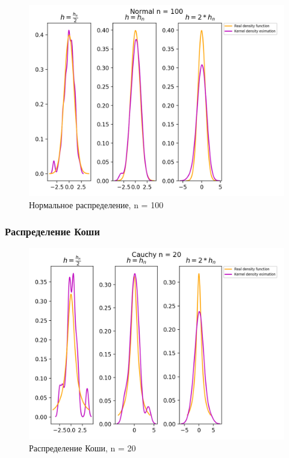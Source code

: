 \begin{figure}[H]
	\begin{center}
		\includegraphics[scale=0.7]{fig/Normal100_kde.png}
		\caption{Нормальное распределение, n = 100} 
		\label{pic:pic_name}
	\end{center}
\end{figure}




\subsubsection{Распределение Коши}
\begin{figure}[H]
	\begin{center}
		\includegraphics[scale=0.7]{fig/Cauchy20_kde.png}
		\caption{Распределение Коши, n = 20} 
		\label{pic:pic_name}
	\end{center}
\end{figure}


